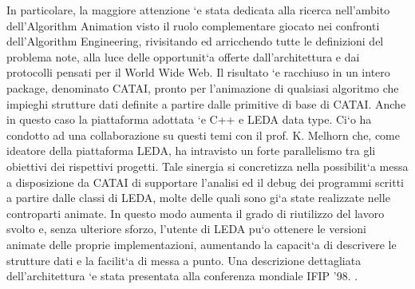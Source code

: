 \documentclass[11pt]{article}
\begin{document}
In particolare, la maggiore attenzione \a`e stata dedicata alla
ricerca nell'ambito dell'Algorithm Animation visto il ruolo
complementare giocato nei confronti dell'Algorithm Engineering,
rivisitando ed arricchendo tutte le definizioni del problema note, alla luce
delle opportunit\a`a offerte dall'architettura e dai protocolli
pensati per il World Wide Web. Il risultato \a`e racchiuso in un
intero package, denominato CATAI, pronto per l'animazione di qualsiasi
algoritmo che impieghi strutture dati definite a partire dalle
primitive di base di CATAI.  Anche in questo caso la piattaforma
adottata \a`e C++ e LEDA data type. Ci\a`o ha condotto ad una collaborazione
su questi temi con il prof. K. Melhorn che, come ideatore della
piattaforma LEDA, ha intravisto un forte parallelismo tra gli obiettivi
dei rispettivi progetti. Tale sinergia si concretizza nella
possibilit\a`a messa a disposizione da CATAI di supportare l'analisi
ed il debug dei programmi scritti a partire dalle classi di LEDA,
molte delle quali sono gi\a`a state realizzate nelle controparti
animate.  In questo modo aumenta il grado di riutilizzo del lavoro
svolto e, senza ulteriore sforzo, l'utente di LEDA pu\a`o ottenere le versioni
animate delle proprie implementazioni, aumentando la capacit\a`a di
descrivere le strutture dati e la facilit\a`a di messa a punto.  Una
descrizione dettagliata dell'architettura \a`e stata presentata alla
conferenza mondiale IFIP '98. \cite{IFIP:98}.
\end{document}
